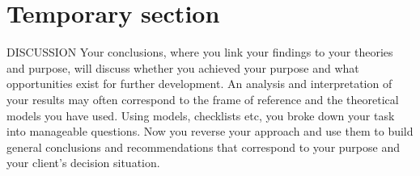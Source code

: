 \section{Temporary section }
DISCUSSION Your conclusions, where you link your findings to your theories and purpose,
will discuss whether you achieved your purpose and what opportunities exist for further
development. An analysis and interpretation of your results may often correspond to the
frame of reference and the theoretical models you have used. Using models, checklists etc,
you broke down your task into manageable questions. Now you reverse your approach and
use them to build general conclusions and recommendations that correspond to your
purpose and your client's decision situation.

